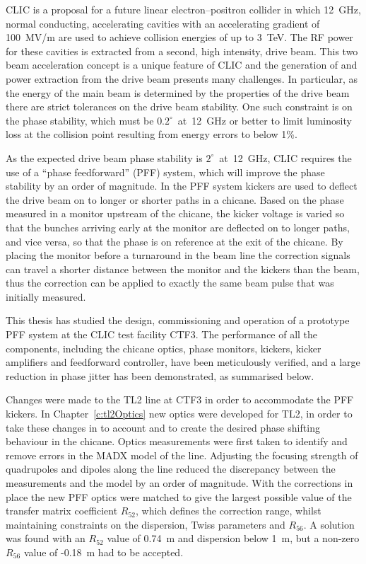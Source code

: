 

CLIC is a proposal for a future linear electron--positron collider in which 12~GHz, normal conducting, accelerating cavities with an accelerating gradient of 100~MV/m are used to achieve collision energies of up to 3~TeV. The RF power for these cavities is extracted from a second, high intensity, drive beam. This two beam acceleration concept is a unique feature of CLIC and the generation of and power extraction from the drive beam presents many challenges. In particular, as the energy of the main beam is determined by the properties of the drive beam there are strict tolerances on the drive beam stability. One such constraint is on the phase stability, which must be \(0.2^\circ\)~at~12~GHz or better to limit luminosity loss at the collision point resulting from energy errors to below 1\%. 

As the expected drive beam phase stability is \(2^\circ\)~at~12~GHz, CLIC requires the use of a ``phase feedforward'' (PFF) system, which will improve the phase stability by an order of magnitude. In the PFF system kickers are used to deflect the drive beam on to longer or shorter paths in a chicane. Based on the phase measured in a monitor upstream of the chicane, the kicker voltage is varied so that the bunches arriving early at the monitor are deflected on to longer paths, and vice versa, so that the phase is on reference at the exit of the chicane. By placing the monitor before a turnaround in the beam line the correction signals can travel a shorter distance between the monitor and the kickers than the beam, thus the correction can be applied to exactly the same beam pulse that was initially measured. 

This thesis has studied the design, commissioning and operation of a prototype PFF system at the CLIC test facility CTF3. The performance of all the components, including the chicane optics, phase monitors, kickers, kicker amplifiers and feedforward controller, have been meticulously verified, and a large reduction in phase jitter has been demonstrated, as summarised below.

Changes were made to the TL2 line at CTF3 in order to accommodate the PFF kickers. In Chapter~\ref{c:tl2Optics} new optics were developed for TL2, in order to take these changes in to account and to create the desired phase shifting behaviour in the chicane. Optics measurements were first taken to identify and remove errors in the MADX model of the line. Adjusting the focusing strength of quadrupoles and dipoles along the line reduced the discrepancy between the measurements and the model by an order of magnitude. With the corrections in place the new PFF optics were matched to give the largest possible value of the transfer matrix coefficient \(R_{52}\), which defines the correction range, whilst maintaining constraints on the dispersion, Twiss parameters and \(R_{56}\). A solution was found with an \(R_{52}\) value of 0.74~m and dispersion below 1~m, but a non-zero \(R_{56}\) value of -0.18~m had to be accepted.

